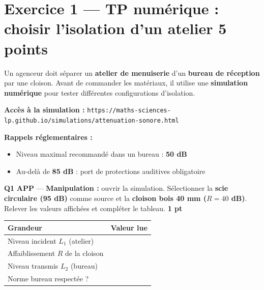 \documentclass[a4paper,11pt]{article}
\newcommand{\pts}[1]{\hfill\textcolor{gris}{\small\textbf{#1}}}
\newcommand{\comp}[1]{\colorbox{blue!10}{\scriptsize\textbf{#1}}}
\begin{document}
\newpage

\section*{Exercice 1 — TP numérique : choisir l'isolation d'un atelier \pts{5 points}}

\begin{contextebox}
Un agenceur doit séparer un \textbf{atelier de menuiserie} d'un \textbf{bureau de réception} par une cloison. Avant de commander les matériaux, il utilise une \textbf{simulation numérique} pour tester différentes configurations d'isolation.

\medskip
\textbf{Accès à la simulation :} \texttt{https://maths-sciences-lp.github.io/simulations/attenuation-sonore.html}

\medskip
\textbf{Rappels réglementaires :}
\begin{itemize}[nosep]
  \item Niveau maximal recommandé dans un bureau : \textbf{50 dB}
  \item Au-delà de \textbf{85 dB} : port de protections auditives obligatoire
\end{itemize}
\end{contextebox}

\vspace{6pt}
\textbf{Q1} \comp{APP} — \textbf{Manipulation :} ouvrir la simulation. Sélectionner la \textbf{scie circulaire (95 dB)} comme source et la \textbf{cloison bois 40 mm ($R = 40$ dB)}. Relever les valeurs affichées et compléter le tableau. \pts{1 pt}

\begin{center}
\renewcommand{\arraystretch}{1.8}
\begin{tabular}{|>{\centering\arraybackslash}m{5cm}|>{\centering\arraybackslash}m{4cm}|}
\hline
\textbf{Grandeur} & \textbf{Valeur lue} \\
\hline
Niveau incident $L_1$ (atelier) & \dotfill \\
\hline
Affaiblissement $R$ de la cloison & \dotfill \\
\hline
Niveau transmis $L_2$ (bureau) & \dotfill \\
\hline
Norme bureau respectée ? & \dotfill \\
\hline
\end{tabular}
\renewcommand{\arraystretch}{1}
\end{center}
\end{document}
